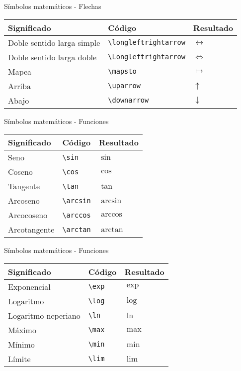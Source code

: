 \documentclass[
  ignorenonframetext,
]{beamer}
\begin{document}
\begin{frame}[fragile]{Símbolos matemáticos - Flechas}
\protect\hypertarget{suxedmbolos-matemuxe1ticos---flechas-1}{}
\begin{longtable}[]{@{}lll@{}}
\toprule
Significado & Código & Resultado \\
\midrule
\endhead
Doble sentido larga simple & \texttt{\textbackslash{}longleftrightarrow}
& \(\longleftrightarrow\) \\
Doble sentido larga doble & \texttt{\textbackslash{}Longleftrightarrow}
& \(\Longleftrightarrow\) \\
Mapea & \texttt{\textbackslash{}mapsto} & \(\mapsto\) \\
Arriba & \texttt{\textbackslash{}uparrow} & \(\uparrow\) \\
Abajo & \texttt{\textbackslash{}downarrow} & \(\downarrow\) \\
\bottomrule
\end{longtable}
\end{frame}

\begin{frame}[fragile]{Símbolos matemáticos - Funciones}
\protect\hypertarget{suxedmbolos-matemuxe1ticos---funciones}{}
\begin{longtable}[]{@{}lll@{}}
\toprule
Significado & Código & Resultado \\
\midrule
\endhead
Seno & \texttt{\textbackslash{}sin} & \(\sin\) \\
Coseno & \texttt{\textbackslash{}cos} & \(\cos\) \\
Tangente & \texttt{\textbackslash{}tan} & \(\tan\) \\
Arcoseno & \texttt{\textbackslash{}arcsin} & \(\arcsin\) \\
Arcocoseno & \texttt{\textbackslash{}arccos} & \(\arccos\) \\
Arcotangente & \texttt{\textbackslash{}arctan} & \(\arctan\) \\
\bottomrule
\end{longtable}
\end{frame}

\begin{frame}[fragile]{Símbolos matemáticos - Funciones}
\protect\hypertarget{suxedmbolos-matemuxe1ticos---funciones-1}{}
\begin{longtable}[]{@{}lll@{}}
\toprule
Significado & Código & Resultado \\
\midrule
\endhead
Exponencial & \texttt{\textbackslash{}exp} & \(\exp\) \\
Logaritmo & \texttt{\textbackslash{}log} & \(\log\) \\
Logaritmo neperiano & \texttt{\textbackslash{}ln} & \(\ln\) \\
Máximo & \texttt{\textbackslash{}max} & \(\max\) \\
Mínimo & \texttt{\textbackslash{}min} & \(\min\) \\
Límite & \texttt{\textbackslash{}lim} & \(\lim\) \\
\bottomrule
\end{longtable}
\end{frame}
\end{document}
